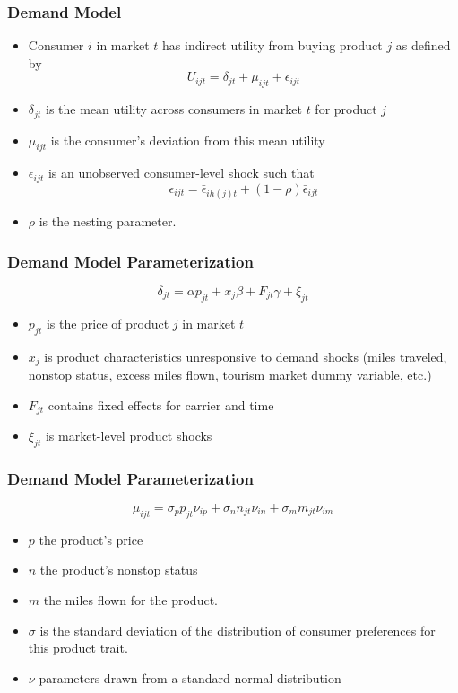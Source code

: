 \documentclass[xcolor=dvipsnames]{beamer}
\begin{document}
    \begin{frame}
        \frametitle{Demand Model}
        \begin{itemize}
        \item  Consumer $i$ in market $t$ has indirect utility from buying product $j$ as defined by 
\[U_{ijt} = \delta_{jt} + \mu_{ijt} + \epsilon_{ijt}\]
        \item $\delta_{jt}$ is the mean utility across consumers in market $t$ for product $j$
		\item $\mu_{ijt}$ is the consumer's deviation from this mean utility
		\item  $\epsilon_{ijt}$ is an unobserved consumer-level shock such that \[\epsilon_{ijt} = \bar{\epsilon}_{ih(j)t} + (1 - \rho)\bar{\epsilon}_{ijt}\] 

        
		\item $\rho$ is the nesting parameter. 
        \end{itemize}
    \end{frame}

    \begin{frame}
        \frametitle{Demand Model Parameterization}
        \[\delta_{jt} = \alpha p_{jt} + x_{j} \beta + F_{jt}\gamma  +  \xi_{jt}\]
         \vspace{-8mm}
        \begin{itemize}
            \item $p_{jt}$ is the price of product $j$ in market $t$
            \item $x_j$ is product characteristics unresponsive to demand shocks (miles traveled, nonstop status, excess miles flown, tourism market dummy variable, etc.)
            \item $F_{jt}$ contains fixed effects for carrier and time
            \item $\xi_{jt}$ is market-level product shocks
        \end{itemize}
    \end{frame}

    \begin{frame}
        \frametitle{Demand Model Parameterization}
             \[\mu_{ijt} = \sigma_{p} p_{jt} \nu_{ip} + \sigma_{n} n_{jt} \nu_{in} + \sigma_{m} m_{jt} \nu_{im} \] 
             \vspace{-8mm}
            \begin{itemize}
                \item $p$ the product's price
                \item $n$ the product's nonstop status
                \item $m$ the miles flown for the product.
                \item $\sigma$ is the standard deviation of the distribution of consumer preferences for this product trait. 
                \item $\nu$ parameters drawn from a standard normal distribution 
            \end{itemize}
    \end{frame}
\end{document}
